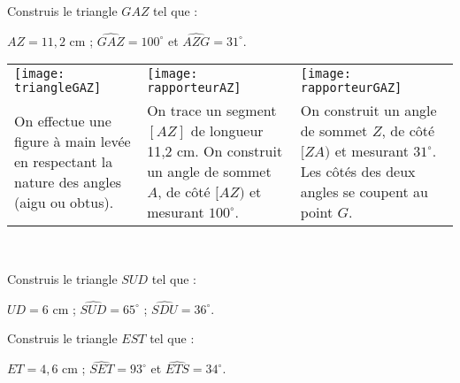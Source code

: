 \begin{methode*1}

 \begin{exemple*1}
Construis le triangle $GAZ$ tel que :

$AZ = 11,2$ cm ; $\widehat{GAZ} = 100^\circ$ et $\widehat{AZG} = 31^\circ$. \\[1em]
\begin{tabularx}{\textwidth}{X|X|X}
 \texttt{[image: triangleGAZ]} &  \texttt{[image: rapporteurAZ]} & \texttt{[image: rapporteurGAZ]} \\ 
 On effectue une figure à main levée en respectant la nature des angles (aigu ou obtus). & On trace un segment $[AZ]$ de longueur 11,2 cm. On construit un angle de sommet $A$, de côté $[AZ)$ et mesurant $100^\circ$. & On construit un angle de sommet $Z$, de côté $[ZA)$ et mesurant $31^\circ$. Les côtés des deux angles se coupent au point $G$. \\
\end{tabularx} \\

\end{exemple*1}

\exercice
Construis le triangle $SUD$ tel que :

$UD = 6$ cm ; $\widehat{SUD} = 65^\circ$ ; $\widehat{SDU} = 36^\circ$.
\vspace{4cm}

\exercice
Construis le triangle $EST$ tel que :

$ET = 4,6$ cm ; $\widehat{SET} = 93^\circ$ et $\widehat{ETS} = 34^\circ$.
\vspace{2cm}
 
\end{methode*1}

